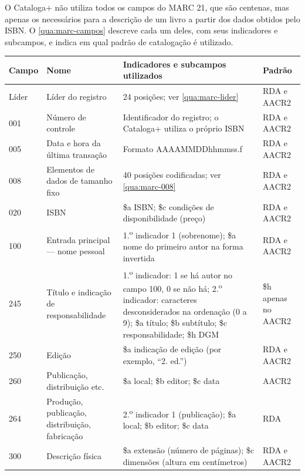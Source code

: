 O Cataloga+ não utiliza todos os campos do MARC 21, que são centenas, mas apenas os necessários para a descrição de um livro a partir dos dados obtidos pelo ISBN. O \autoref{qua:marc-campos} descreve cada um deles, com seus indicadores e subcampos, e indica em qual padrão de catalogação é utilizado.

\begin{quadro}[htbp]
    \centering
    \caption{Campos MARC 21 gerados pelo Cataloga+}
    \label{qua:marc-campos}
    \scriptsize
    \begin{tabular}{|p{}|p{}|p{}|p{}|}
    \hline
    \textbf{Campo} & \textbf{Nome} & \textbf{Indicadores e subcampos utilizados} & \textbf{Padrão} \\ \hline
    Líder & Líder do registro & 24 posições; ver \autoref{qua:marc-lider} & RDA e AACR2 \\ \hline
    001 & Número de controle & Identificador do registro; o Cataloga+ utiliza o próprio ISBN & RDA e AACR2 \\ \hline
    005 & Data e hora da última transação & Formato AAAAMMDDhhmmss.f & RDA e AACR2 \\ \hline
    008 & Elementos de dados de tamanho fixo & 40 posições codificadas; ver \autoref{qua:marc-008} & RDA e AACR2 \\ \hline
    020 & ISBN & \$a ISBN; \$c condições de disponibilidade (preço) & RDA e AACR2 \\ \hline
    100 & Entrada principal --- nome pessoal & 1.\textsuperscript{o} indicador 1 (sobrenome); \$a nome do primeiro autor na forma invertida & RDA e AACR2 \\ \hline
    245 & Título e indicação de responsabilidade & 1.\textsuperscript{o} indicador: 1 se há autor no campo 100, 0 se não há; 2.\textsuperscript{o} indicador: caracteres desconsiderados na ordenação (0 a 9); \$a título; \$b subtítulo; \$c responsabilidade; \$h DGM & \$h apenas no AACR2 \\ \hline
    250 & Edição & \$a indicação de edição (por exemplo, ``2. ed.'') & RDA e AACR2 \\ \hline
    260 & Publicação, distribuição etc. & \$a local; \$b editor; \$c data & AACR2 \\ \hline
    264 & Produção, publicação, distribuição, fabricação & 2.\textsuperscript{o} indicador 1 (publicação); \$a local; \$b editor; \$c data & RDA \\ \hline
    300 & Descrição física & \$a extensão (número de páginas); \$c dimensões (altura em centímetros) & RDA e AACR2 \\ \hline

\end{tabular}
\end{quadro}
